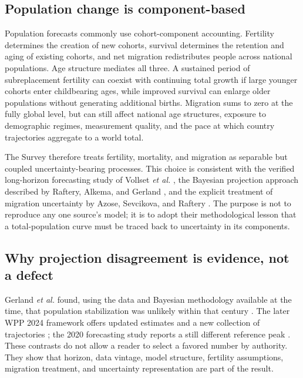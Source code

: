 \documentclass[conference]{IEEEtran}
\begin{document}
\subsection{Population change is component-based}

Population forecasts commonly use cohort-component accounting. Fertility determines the creation of new cohorts, survival determines the retention and aging of existing cohorts, and net migration redistributes people across national populations. Age structure mediates all three. A sustained period of subreplacement fertility can coexist with continuing total growth if large younger cohorts enter childbearing ages, while improved survival can enlarge older populations without generating additional births. Migration sums to zero at the fully global level, but can still affect national age structures, exposure to demographic regimes, measurement quality, and the pace at which country trajectories aggregate to a world total.

The Survey therefore treats fertility, mortality, and migration as separable but coupled uncertainty-bearing processes. This choice is consistent with the verified long-horizon forecasting study of Vollset \textit{et al.} \cite{vollset2020}, the Bayesian projection approach described by Raftery, Alkema, and Gerland \cite{raftery2014}, and the explicit treatment of migration uncertainty by Azose, Sevcikova, and Raftery \cite{azose2016}. The purpose is not to reproduce any one source's model; it is to adopt their methodological lesson that a total-population curve must be traced back to uncertainty in its components.

\subsection{Why projection disagreement is evidence, not a defect}

Gerland \textit{et al.} found, using the data and Bayesian methodology available at the time, that population stabilization was unlikely within that century \cite{gerland2014}. The later WPP 2024 framework offers updated estimates and a new collection of trajectories \cite{unwpp2024}; the 2020 forecasting study reports a still different reference peak \cite{vollset2020}. These contrasts do not allow a reader to select a favored number by authority. They show that horizon, data vintage, model structure, fertility assumptions, migration treatment, and uncertainty representation are part of the result.
\end{document}
